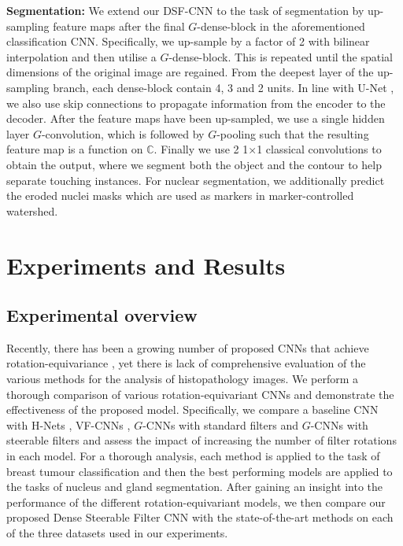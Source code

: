 \documentclass[journal]{IEEEtran}
\newcommand\complexes{\mathbb{C}}
\begin{document}
	\textbf{Segmentation: }We extend our DSF-CNN to the task of segmentation by up-sampling feature maps after the final $G$-dense-block in the aforementioned classification CNN. Specifically, we up-sample by a factor of 2 with bilinear interpolation and then utilise a $G$-dense-block. This is repeated until the spatial dimensions of the original image are regained. From the deepest layer of the up-sampling branch, each dense-block contain 4, 3 and 2 units. In line with U-Net \cite{ronneberger2015u}, we also use skip connections to propagate information from the encoder to the decoder. After the feature maps have been up-sampled, we use a single hidden layer $G$-convolution, which is followed by $G$-pooling such that the resulting feature map is a function on $\complexes$. Finally we use 2 1$\times$1 classical convolutions to obtain the output, where we segment both the object and the contour to help separate touching instances. For nuclear segmentation, we additionally predict the eroded nuclei masks which are used as markers in marker-controlled watershed.  
	
	\section{Experiments and Results}\label{section:expandresults}
    
    \subsection{Experimental overview}
    \label{section:expoverview}
    Recently, there has been a growing number of proposed CNNs that achieve rotation-equivariance \cite{cohen2016group, weiler2018learning, marcos2017rotation, bekkers2018roto, worrall2017harmonic}, yet there is lack of comprehensive evaluation of the various methods for the analysis of histopathology images. We perform a thorough comparison of various rotation-equivariant CNNs and demonstrate the effectiveness of the proposed model. Specifically, we compare a baseline CNN with H-Nets \cite{worrall2017harmonic}, VF-CNNs \cite{marcos2017rotation}, $G$-CNNs with standard filters \cite{cohen2016group, bekkers2018roto} and $G$-CNNs with steerable filters \cite{weiler2018learning} and assess the impact of increasing the number of filter rotations in each model. For a thorough analysis, each method is applied to the task of breast tumour classification and then the best performing models are applied to the tasks of nucleus and gland segmentation. After gaining an insight into the performance of the different rotation-equivariant models, we then compare our proposed Dense Steerable Filter CNN with the state-of-the-art methods on each of the three datasets used in our experiments.
    
\end{document}
